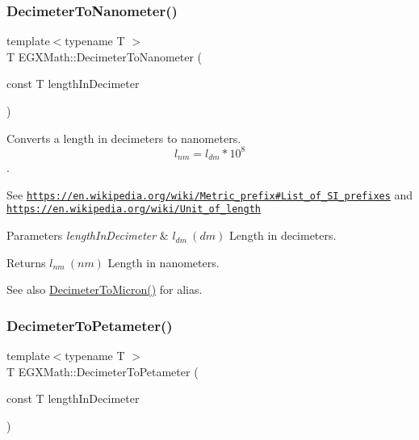 \subsubsection{\texorpdfstring{Decimeter\+To\+Nanometer()}{DecimeterToNanometer()}}
{\footnotesize\ttfamily template$<$typename T $>$ \\
T E\+G\+X\+Math\+::\+Decimeter\+To\+Nanometer (\begin{DoxyParamCaption}\item[{const T}]{length\+In\+Decimeter }\end{DoxyParamCaption})}



Converts a length in decimeters to nanometers. \[ l_{nm}=l_{dm} * 10^{8} \]. 

See \href{https://en.wikipedia.org/wiki/Metric_prefix#List_of_SI_prefixes}{\tt https\+://en.\+wikipedia.\+org/wiki/\+Metric\+\_\+prefix\#\+List\+\_\+of\+\_\+\+S\+I\+\_\+prefixes} and \href{https://en.wikipedia.org/wiki/Unit_of_length}{\tt https\+://en.\+wikipedia.\+org/wiki/\+Unit\+\_\+of\+\_\+length} 
\begin{DoxyParams}{Parameters}
{\em length\+In\+Decimeter} & $ l_{dm}\ (dm)$ Length in decimeters. \\
\hline
\end{DoxyParams}
\begin{DoxyReturn}{Returns}
$ l_{nm}\ (nm)$ Length in nanometers. 
\end{DoxyReturn}
\begin{DoxySeeAlso}{See also}
\mbox{\hyperlink{group___e_g_x_math-_conversions-_length_conversions-_s_i-_decimeter-_non-_s_i_gaebafc6e167156bb5158e5d335b25334b}{Decimeter\+To\+Micron()}} for alias. 
\end{DoxySeeAlso}
\mbox{\label{group___e_g_x_math-_conversions-_length_conversions-_s_i-_decimeter-_s_i_gaaaaf9805ec7a853f4d9ae242baf3908a}} 
\subsubsection{\texorpdfstring{Decimeter\+To\+Petameter()}{DecimeterToPetameter()}}
{\footnotesize\ttfamily template$<$typename T $>$ \\
T E\+G\+X\+Math\+::\+Decimeter\+To\+Petameter (\begin{DoxyParamCaption}\item[{const T}]{length\+In\+Decimeter }\end{DoxyParamCaption})}



